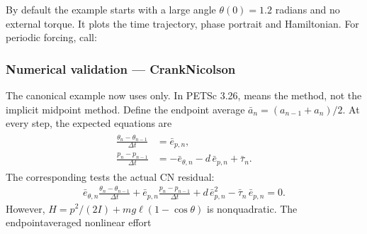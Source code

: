 \documentclass[letterpaper,10pt,english]{sphinxmanual}
\begin{document}
\sphinxAtStartPar
By default the example starts with a large angle
\(\theta(0)=1.2\) radians and no external torque.
It plots the time trajectory, phase portrait and Hamiltonian.
For periodic forcing, call:

\begin{sphinxVerbatim}[commandchars=\\\{\}]
 
   
\end{sphinxVerbatim}


\subsubsection{Numerical validation — Crank\textendash{}Nicolson}
\label{\detokenize{examples/nonlinear_pendulum:numerical-validation-cranknicolson}}
\sphinxAtStartPar
The canonical example now uses  only.
In PETSc 3.26,  means the 
method, not the implicit midpoint method. Define the endpoint
average \(\bar a_n=(a_{n-1}+a_n)/2\). At every step,
the expected equations are
\begin{equation*}
\begin{split}\begin{aligned}
\frac{\theta_n-\theta_{n-1}}{\Delta t}
   &= \bar e_{p,n},\\
\frac{p_n-p_{n-1}}{\Delta t}
   &= -\bar e_{\theta,n}-d\,\bar e_{p,n}
      +\bar\tau_n.
\end{aligned}\end{split}
\end{equation*}
\sphinxAtStartPar
The corresponding 
tests the actual CN residual:
\begin{equation*}
\begin{split}\bar e_{\theta,n}
   \frac{\theta_n-\theta_{n-1}}{\Delta t}
+\bar e_{p,n}
   \frac{p_n-p_{n-1}}{\Delta t}
+d\,\bar e_{p,n}^2
-\bar\tau_n\,\bar e_{p,n}=0.\end{split}
\end{equation*}
\sphinxAtStartPar
However, \(H=p^2/(2I)+mg\ell(1-\cos\theta)\)
is nonquadratic. The endpoint\sphinxhyphen{}averaged nonlinear effort
\end{document}
